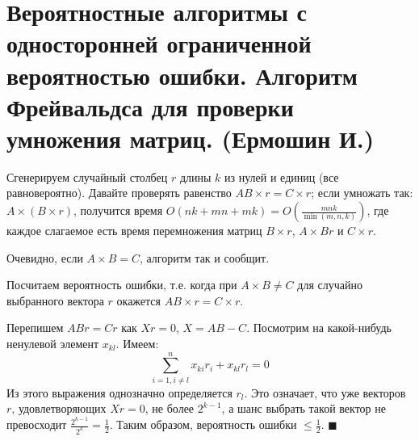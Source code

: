 \hypertarget{Freivalds}{}
\section{Вероятностные алгоритмы с односторонней ограниченной вероятностью ошибки. Алгоритм Фрейвальдса для проверки умножения матриц. (Ермошин И.)}





Сгенерируем случайный столбец $r$ длины $k$ из нулей и единиц (все равновероятно). Давайте проверять равенство $AB\times r=C\times r$; если умножать так: $A\times (B\times r)$, получится время $O(nk+mn+mk)=O\left(\frac{mnk}{\min(m,n,k)}\right)$, где каждое слагаемое есть время перемножения матриц $B\times r$, $A \times Br$ и $C\times r$.


Очевидно, если $A\times B=C$, алгоритм так и сообщит.

Посчитаем вероятность ошибки, т.е. когда при $A\times B \neq C$ для случайно выбранного вектора $r$ окажется $AB\times r = C\times r$.

Перепишем $ABr = Cr$ как $Xr=0$, $X=AB-C$. Посмотрим на какой-нибудь ненулевой элемент $x_{kl}$. Имеем:
$$\sum_{i=1, i\ne l}^{n} x_{ki}r_i+x_{kl}r_l=0$$
Из этого выражения однозначно определяется $r_l$. Это означает, что уже векторов $r$, удовлетворяющих $Xr=0$, не более $2^{k-1}$, а шанс выбрать такой вектор не превосходит $\frac{2^{k-1}}{2^k} = \frac{1}{2}$. Таким образом, вероятность ошибки $\le\frac{1}{2}$. $\blacksquare$